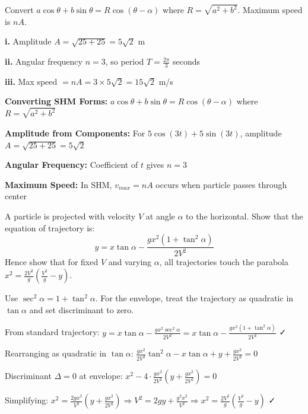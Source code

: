 \begin{hint}
Convert $a\cos\theta + b\sin\theta = R\cos(\theta - \alpha)$ where $R = \sqrt{a^2 + b^2}$. Maximum speed is $nA$.
\end{hint}

\begin{solution}
\textbf{i.} Amplitude $A = \sqrt{25 + 25} = 5\sqrt{2}$ m

\textbf{ii.} Angular frequency $n = 3$, so period $T = \frac{2\pi}{3}$ seconds

\textbf{iii.} Max speed $= nA = 3 \times 5\sqrt{2} = 15\sqrt{2}$ m/s
\end{solution}

\begin{takeaways}
\item \textbf{Converting SHM Forms:} $a\cos\theta + b\sin\theta = R\cos(\theta - \alpha)$ where $R = \sqrt{a^2 + b^2}$
\item \textbf{Amplitude from Components:} For $5\cos(3t) + 5\sin(3t)$, amplitude $A = \sqrt{25+25} = 5\sqrt{2}$
\item \textbf{Angular Frequency:} Coefficient of $t$ gives $n = 3$
\item \textbf{Maximum Speed:} In SHM, $v_{max} = nA$ occurs when particle passes through center
\end{takeaways}

\begin{problem}
A particle is projected with velocity $V$ at angle $\alpha$ to the horizontal. Show that the equation of trajectory is:
$$y = x\tan\alpha - \frac{gx^2(1 + \tan^2\alpha)}{2V^2}$$
Hence show that for fixed $V$ and varying $\alpha$, all trajectories touch the parabola $x^2 = \frac{2V^2}{g}\left(\frac{V^2}{g} - y\right)$.
\end{problem}

\begin{hint}
Use $\sec^2\alpha = 1 + \tan^2\alpha$. For the envelope, treat the trajectory as quadratic in $\tan\alpha$ and set discriminant to zero.
\end{hint}

\begin{solution}
From standard trajectory: $y = x\tan\alpha - \frac{gx^2\sec^2\alpha}{2V^2} = x\tan\alpha - \frac{gx^2(1+\tan^2\alpha)}{2V^2}$ ✓

Rearranging as quadratic in $\tan\alpha$: $\frac{gx^2}{2V^2}\tan^2\alpha - x\tan\alpha + y + \frac{gx^2}{2V^2} = 0$

Discriminant $\Delta = 0$ at envelope: $x^2 - 4 \cdot \frac{gx^2}{2V^2}\left(y + \frac{gx^2}{2V^2}\right) = 0$

Simplifying: $x^2 = \frac{2gx^2}{V^2}\left(y + \frac{gx^2}{2V^2}\right) \Rightarrow V^2 = 2gy + \frac{g^2x^2}{V^2} \Rightarrow x^2 = \frac{2V^2}{g}\left(\frac{V^2}{g} - y\right)$ ✓
\end{solution}

